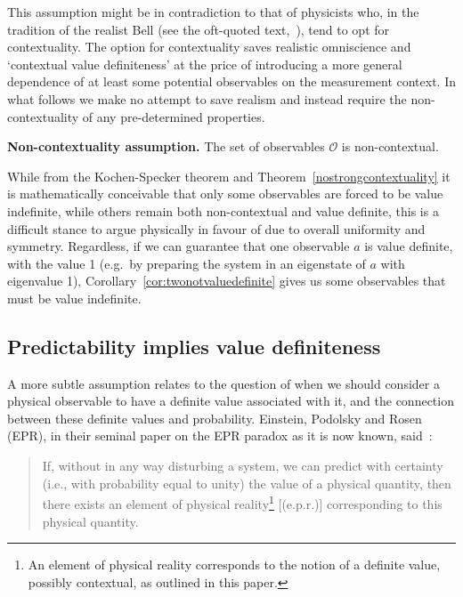\documentclass[%
 preprint,
 showpacs,
 showkeys,
 amsmath,
 amssymb,
 aps,
 pra,
 ]{revtex4-1}
\newtheorem{Assumption}{Assumption}
\theoremstyle{definition}
\begin{document}
This assumption might be in contradiction to that of  physicists who,
in the tradition of the realist Bell (see the oft-quoted text,~\cite{bell-66}),
tend to opt for contextuality.
The option for contextuality saves realistic omniscience and `contextual value definiteness' at the price of introducing a more general dependence of at least some potential observables on the measurement context.
In what follows we make no attempt to save realism and instead require the non-contextuality of any pre-determined properties.

	\textbf{Non-contextuality assumption.} The set of observables $\mathcal{O}$ is non-contextual.

While from the Kochen-Specker theorem and Theorem~\ref{nostrongcontextuality} it is mathematically conceivable that only some observables are forced to be value indefinite, while others remain both non-contextual and value definite, this is a difficult stance to argue physically in favour of due to overall uniformity and symmetry.
Regardless, if we can guarantee that one observable $a$ is value definite, with the value 1 (e.g.\ by preparing the system in an eigenstate of $a$ with eigenvalue 1), Corollary~\ref{cor:twonotvaluedefinite} gives us some observables that must be value indefinite.

\subsection{Predictability implies value definiteness}
\label{sec:predImpliesVI}


A more subtle assumption relates to the question of when we should consider a physical observable to have a definite value associated with it, and the connection between these definite values and probability.
Einstein, Podolsky and Rosen (EPR), in their seminal paper on the EPR paradox as it is now known, said~\cite[pp. 777]{epr}:
\begin{quote}
	If, without in any way disturbing a system, we can predict with certainty (i.e., with probability equal to unity)
the value of a physical quantity, then there exists an element of physical reality\footnote{An element of physical reality corresponds
to the notion of a definite value, possibly contextual,
as outlined in this paper.} [(e.p.r.)]  corresponding to this physical quantity.
\end{quote}
\end{document}
